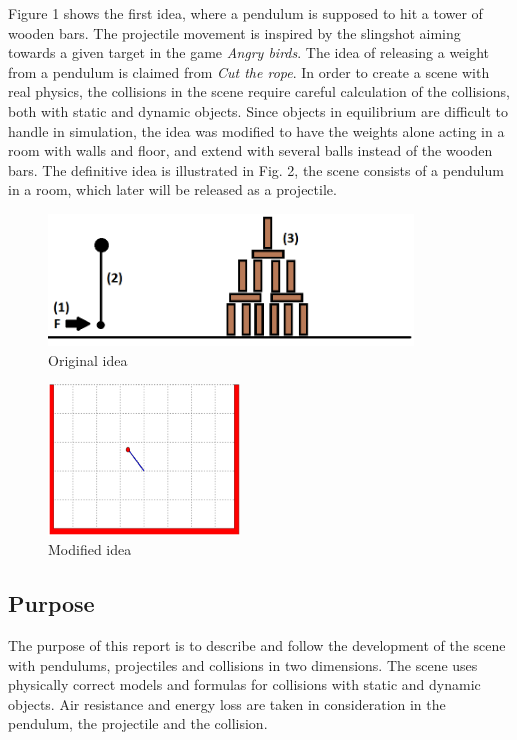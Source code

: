 \documentclass[a4paper,12pt,twoside,english]{article}
\begin{document}
Figure 1 shows the first idea, where a pendulum is supposed to hit a tower of wooden bars. The projectile movement is inspired by the slingshot aiming towards a given target in the game {\itshape Angry birds}. The idea of releasing a weight from a pendulum is claimed from {\itshape Cut the rope}. In order to create a scene with real physics, the collisions in the scene require careful calculation of the collisions, both with static and dynamic objects. Since objects in equilibrium are difficult to handle in simulation, the idea was modified to have the weights alone acting in a room with walls and floor, and extend with several balls instead of the wooden bars. The definitive idea is illustrated in Fig. 2, the scene consists of a pendulum in a room, which later will be released as a projectile.


\begin{figure}[h]
\includegraphics[height=3.5cm]{bilder/ideasketch.png}
\centering
\caption{Original idea}
\end{figure}
\begin{figure}[h]
\includegraphics[height=4cm]{bilder/Matlab_Pendulum1.png}
\centering
\caption{Modified idea}
\end{figure} 



\subsection{Purpose}
The purpose of this report is to describe and follow the development of the scene with pendulums, projectiles and collisions in two dimensions. The scene uses physically correct models and formulas for collisions with static and dynamic objects. Air resistance and energy loss are taken in consideration in the pendulum, the projectile and the collision.
\end{document}
